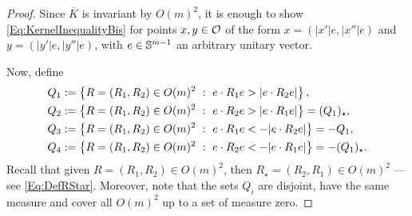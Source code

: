 \begin{proof}
Since $\overline{K}$ is invariant by $O(m)^2$, it is enough to show \eqref{Eq:KernelInequalityBis} for points $x, y\in \mathcal{O}$ of the form $x = (|x'|e, |x''|e)$ and $y = (|y'|e, |y''|e)$, with $e \in \mathbb{S}^{m-1}$ an arbitrary unitary vector.

Now, define
\begin{equation}
\label{Eq:DefQ}
	\begin{split}
	Q_1 &:= \left \{ R = (R_1,R_2) \in O(m)^2 \ : \ e\cdot R_1 e > |e\cdot R_2 e| \right \},\\
	Q_2 &:= \left \{ R = (R_1,R_2) \in O(m)^2 \ : \ e\cdot R_2 e > |e\cdot R_1 e| \right \} = (Q_1)_\star,\\
	Q_3 &:= \left \{ R = (R_1,R_2) \in O(m)^2 \ : \ e\cdot R_1 e < -|e\cdot R_2 e| \right \} = -Q_1,\\
	Q_4 &:= \left \{ R = (R_1,R_2) \in O(m)^2 \ : \ e\cdot R_2 e < - |e\cdot R_1 e| \right \} = -(Q_1)_\star.
	\end{split}
\end{equation}
Recall that given $R=(R_1,R_2)\in O(m)^2$, then $R_\star=(R_2,R_1)\in O(m)^2$ ---see \eqref{Eq:DefRStar}. Moreover, note that the sets $Q_i$ are disjoint, have the same measure and cover all $O(m)^2$ up to a set of measure zero. 


\end{proof}
